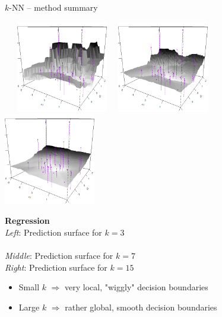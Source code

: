\begin{frame}{$k$-NN -- method summary}
\begin{minipage}{0.7\textwidth}
\, \, \, \includegraphics[width=0.3\textwidth]{figure/knn-reg-3d-3.png} \, \,
\includegraphics[width=0.3\textwidth]{figure/knn-reg-3d-7.png} \, \,
\includegraphics[width=0.3\textwidth]{figure/knn-reg-3d-15.png}
\end{minipage}%
\hfill
\begin{minipage}{0.25\textwidth}
  \tiny
  \raggedright
  \textbf{Regression} \\
  \textit{Left}: Prediction surface for $k = 3$\\ \\
  \textit{Middle}: Prediction surface for $k = 7$\\
  \textit{Right}: Prediction surface for $k = 15$
\end{minipage}

\medskip

\begin{itemize}
    \item Small $k$ $\Rightarrow$ very local, "wiggly" decision boundaries
    \item Large $k$ $\Rightarrow$ rather global, smooth decision boundaries
\end{itemize}

\end{frame}

